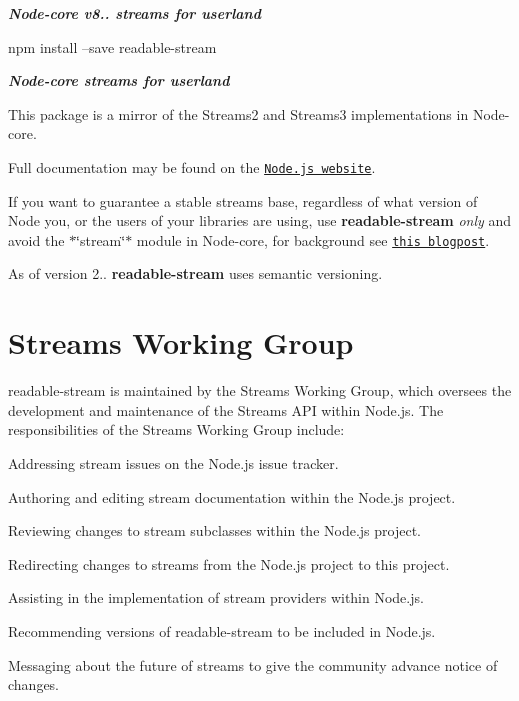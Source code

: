 {\itshape {\bfseries Node-\/core v8.. streams for userland}} \href{https://travis-ci.org/nodejs/readable-stream}{\tt }

\href{https://nodei.co/npm/readable-stream/}{\tt } \href{https://nodei.co/npm/readable-stream/}{\tt }

\href{https://saucelabs.com/u/readable-stream}{\tt }


\begin{DoxyCode}
npm install --save readable-stream
\end{DoxyCode}


{\itshape {\bfseries Node-\/core streams for userland}}

This package is a mirror of the Streams2 and Streams3 implementations in Node-\/core.

Full documentation may be found on the \href{https://nodejs.org/dist/v8.1.3/docs/api/stream.html}{\tt Node.\+js website}.

If you want to guarantee a stable streams base, regardless of what version of Node you, or the users of your libraries are using, use {\bfseries readable-\/stream} {\itshape only} and avoid the $\ast$\char`\"{}stream\char`\"{}$\ast$ module in Node-\/core, for background see \href{http://r.va.gg/2014/06/why-i-dont-use-nodes-core-stream-module.html}{\tt this blogpost}.

As of version 2.. {\bfseries readable-\/stream} uses semantic versioning.

\section*{Streams Working Group}

{\ttfamily readable-\/stream} is maintained by the Streams Working Group, which oversees the development and maintenance of the Streams A\+PI within Node.\+js. The responsibilities of the Streams Working Group include\+:


\begin{DoxyItemize}
\item Addressing stream issues on the Node.\+js issue tracker.
\item Authoring and editing stream documentation within the Node.\+js project.
\item Reviewing changes to stream subclasses within the Node.\+js project.
\item Redirecting changes to streams from the Node.\+js project to this project.
\item Assisting in the implementation of stream providers within Node.\+js.
\item Recommending versions of {\ttfamily readable-\/stream} to be included in Node.\+js.
\item Messaging about the future of streams to give the community advance notice of changes.
\end{DoxyItemize}

